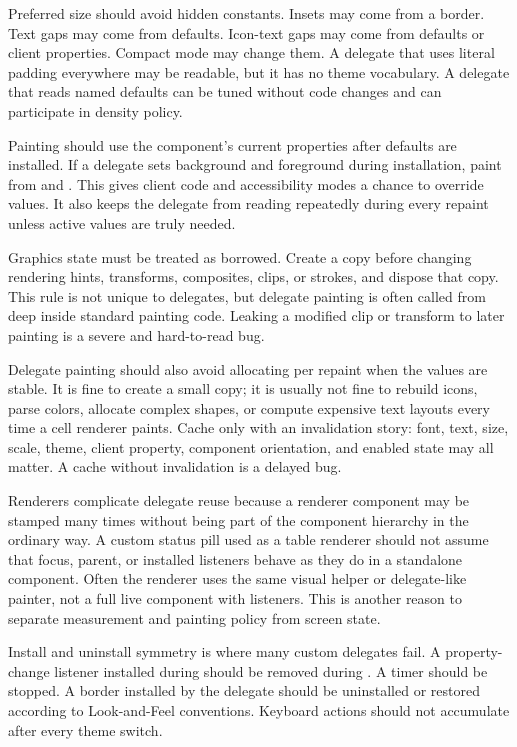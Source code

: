 Preferred size should avoid hidden constants. Insets may come from a border. Text gaps may come from defaults. Icon-text gaps may come from defaults or client properties. Compact mode may change them. A delegate that uses literal padding everywhere may be readable, but it has no theme vocabulary. A delegate that reads named defaults can be tuned without code changes and can participate in density policy.

Painting should use the component's current properties after defaults are installed. If a delegate sets background and foreground during installation, paint from  and . This gives client code and accessibility modes a chance to override values. It also keeps the delegate from reading  repeatedly during every repaint unless active values are truly needed.

Graphics state must be treated as borrowed. Create a copy before changing rendering hints, transforms, composites, clips, or strokes, and dispose that copy. This rule is not unique to delegates, but delegate painting is often called from deep inside standard painting code. Leaking a modified clip or transform to later painting is a severe and hard-to-read bug.

Delegate painting should also avoid allocating per repaint when the values are stable. It is fine to create a small  copy; it is usually not fine to rebuild icons, parse colors, allocate complex shapes, or compute expensive text layouts every time a cell renderer paints. Cache only with an invalidation story: font, text, size, scale, theme, client property, component orientation, and enabled state may all matter. A cache without invalidation is a delayed bug.

Renderers complicate delegate reuse because a renderer component may be stamped many times without being part of the component hierarchy in the ordinary way. A custom status pill used as a table renderer should not assume that focus, parent, or installed listeners behave as they do in a standalone component. Often the renderer uses the same visual helper or delegate-like painter, not a full live component with listeners. This is another reason to separate measurement and painting policy from screen state.

Install and uninstall symmetry is where many custom delegates fail. A property-change listener installed during  should be removed during . A timer should be stopped. A border installed by the delegate should be uninstalled or restored according to Look-and-Feel conventions. Keyboard actions should not accumulate after every theme switch.

